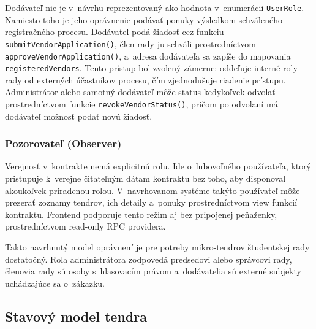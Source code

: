 Dodávateľ nie je v~návrhu reprezentovaný ako hodnota v~enumerácii
\texttt{UserRole}. Namiesto toho je jeho oprávnenie podávať ponuky výsledkom
schváleného registračného procesu. Dodávateľ podá žiadosť cez funkciu
\texttt{submitVendorApplication()}, člen rady ju schváli prostredníctvom
\texttt{approveVendorApplication()}, a~adresa dodávateľa sa zapíše do
mapovania \texttt{registeredVendors}. Tento prístup bol zvolený zámerne:
oddeľuje interné roly rady od externých účastníkov procesu, čím zjednodušuje
riadenie prístupu. Administrátor alebo samotný dodávateľ môže status
kedykoľvek odvolať prostredníctvom funkcie \texttt{revokeVendorStatus()},
pričom po odvolaní má dodávateľ možnosť podať novú žiadosť.

\subsubsection{Pozorovateľ (Observer)}

Verejnosť v~kontrakte nemá explicitnú rolu. Ide o~ľubovoľného používateľa,
ktorý pristupuje k~verejne čitateľným dátam kontraktu bez toho, aby disponoval
akoukoľvek priradenou rolou. V~navrhovanom systéme takýto používateľ
môže prezerať zoznamy tendrov, ich detaily a~ponuky prostredníctvom view
funkcií kontraktu. Frontend podporuje tento režim aj bez pripojenej peňaženky,
prostredníctvom read-only RPC providera.

Takto navrhnutý model oprávnení je pre potreby mikro-tendrov študentskej rady
dostatočný. Rola administrátora zodpovedá predsedovi alebo správcovi rady,
členovia rady sú osoby s~hlasovacím právom a~dodávatelia sú externé subjekty
uchádzajúce sa o~zákazku.

\subsection{Stavový model tendra}
\label{subsec:state_model}


